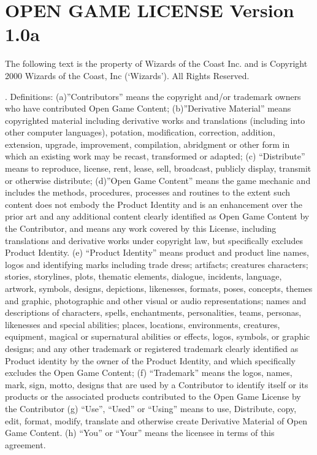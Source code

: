 \chapter{OPEN GAME LICENSE  Version 1.0a}

\begin{scriptsize}
\noindent The following text is the property of Wizards of the Coast Inc. and is Copyright 2000 Wizards of the Coast, Inc (`Wizards'). All Rights Reserved.

. Definitions: (a)”Contributors” means the copyright and/or trademark owners who have contributed Open Game Content; (b)”Derivative Material” means copyrighted material including derivative works and translations (including into other computer languages), potation, modification, correction, addition, extension, upgrade, improvement, compilation, abridgment or other form in which an existing work may be recast, transformed or adapted; (c) “Distribute” means to reproduce, license, rent, lease, sell, broadcast, publicly display, transmit or otherwise distribute; (d)”Open Game Content” means the game mechanic and includes the methods, procedures, processes and routines to the extent such content does not embody the Product Identity and is an enhancement over the prior art and any additional content clearly identified as Open Game Content by the Contributor, and means any work covered by this License, including translations and derivative works under copyright law, but specifically excludes Product Identity. (e) “Product Identity” means product and product line names, logos and identifying marks including trade dress; artifacts; creatures characters; stories, storylines, plots, thematic elements, dialogue, incidents, language, artwork, symbols, designs, depictions, likenesses, formats, poses, concepts, themes and graphic, photographic and other visual or audio representations; names and descriptions of characters, spells, enchantments, personalities, teams, personas, likenesses and special abilities; places, locations, environments, creatures, equipment, magical or supernatural abilities or effects, logos, symbols, or graphic designs; and any other trademark or registered trademark clearly identified as Product identity by the owner of the Product Identity, and which specifically excludes the Open Game Content; (f) “Trademark” means the logos, names, mark, sign, motto, designs that are used by a Contributor to identify itself or its products or the associated products contributed to the Open Game License by the Contributor (g) “Use”, “Used” or “Using” means to use, Distribute, copy, edit, format, modify, translate and otherwise create Derivative Material of Open Game Content. (h) “You” or “Your” means the licensee in terms of this agreement.


\end{scriptsize}
